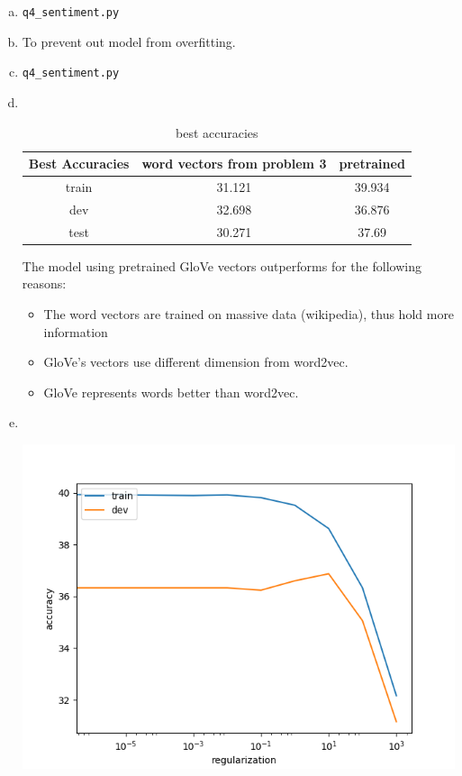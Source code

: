 \documentclass[11pt]{article}
\begin{document}
\begin{enumerate}[(a)]
\item \verb|q4_sentiment.py|
\item To prevent out model from overfitting.
\item \verb|q4_sentiment.py|
\item \
  \begin{table}[H]
    \centering
    \begin{tabular}{|c|c|c|}
      \hline
      Best Accuracies& word vectors from problem 3& pretrained \\ \hline \hline
      train & 31.121& 39.934  \\ \hline
      dev & 32.698& 36.876\\ \hline
      test & 30.271& 37.69  \\ \hline
    \end{tabular}
    \caption{best accuracies}
    \label{tab:1}
  \end{table}
  The model using pretrained GloVe vectors outperforms for the following
  reasons:
  \begin{itemize}
  \item The word vectors are trained on massive data (wikipedia), thus hold more
    information
  \item GloVe's vectors use different dimension from word2vec.
  \item GloVe represents words better than word2vec.
  \end{itemize}
\item \ 
  \begin{center}
    \includegraphics[scale=.8]{../assignment1/q4_reg_v_acc.png}

\end{center}
\end{enumerate}
\end{document}
